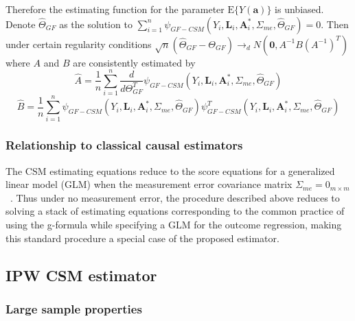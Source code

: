 \documentclass[12pt]{article}
\begin{document}
Therefore the estimating function for the parameter $\text{E} \{ Y(\bm{a}) \}$ is unbiased. Denote $\hat{\Theta}_{GF}$ as the solution to $\sum_{i=1}^{n} \psi_{GF-CSM}(Y_{i}, \bm{L}_{i}, \bm{A}^{*}_{i}, \Sigma_{me}, \hat{\Theta}_{GF}) = 0$. Then under certain regularity conditions $\sqrt{n}(\hat{\Theta}_{GF} - \Theta_{GF}) \rightarrow_{d} N(\textbf{0}, A^{-1}B(A^{-1})^{T})$ where $A$ and $B$ are consistently estimated by
\begin{equation*}
\hat{A} = \frac{1}{n} \sum_{i=1}^{n} \frac{d}{d\Theta_{GF}^{T}} \psi_{GF-CSM}(Y_{i}, \bm{L}_{i}, \bm{A}^{*}_{i}, \Sigma_{me}, \hat{\Theta}_{GF})
\end{equation*}
\begin{equation*}
\hat{B} = \frac{1}{n} \sum_{i=1}^{n} \psi_{GF-CSM}(Y_{i}, \bm{L}_{i}, \bm{A}^{*}_{i}, \Sigma_{me}, \hat{\Theta}_{GF}) \psi^{T}_{GF-CSM}(Y_{i}, \bm{L}_{i}, \bm{A}^{*}_{i}, \Sigma_{me}, \hat{\Theta}_{GF})
\end{equation*}

\subsubsection{Relationship to classical causal estimators}

The CSM estimating equations reduce to the score equations for a generalized linear model (GLM) when the measurement error covariance matrix $\Sigma_{me} = 0_{m \times m}$~\citep{carroll2006}. Thus under no measurement error, the procedure described above reduces to solving a stack of estimating equations corresponding to the common practice of using the g-formula while specifying a GLM for the outcome regression, making this standard procedure a special case of the proposed estimator.

\subsection{IPW CSM estimator}

\subsubsection{Large sample properties}
\end{document}
